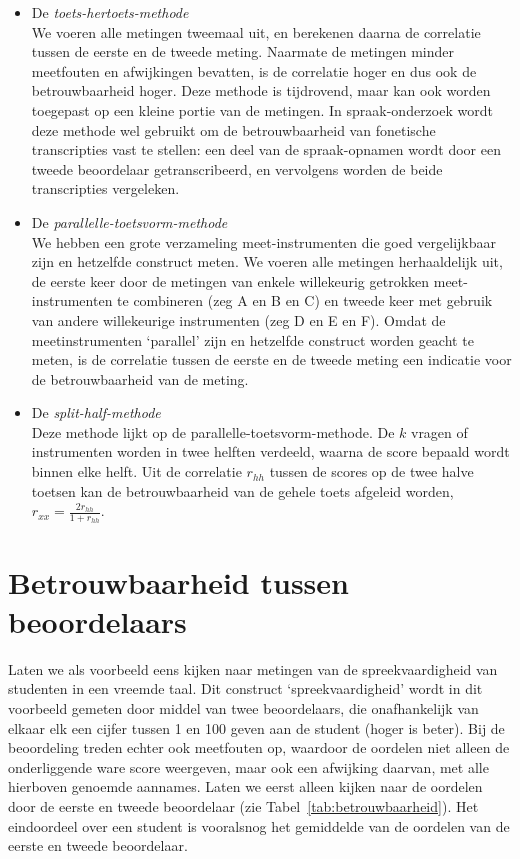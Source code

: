 \documentclass[
]{book}
\begin{document}
\begin{itemize}
\item
  De \emph{toets-hertoets-methode}\\
  We voeren alle metingen tweemaal uit, en berekenen daarna de
  correlatie tussen de eerste en de tweede meting. Naarmate de
  metingen minder meetfouten en afwijkingen bevatten, is de correlatie
  hoger en dus ook de betrouwbaarheid hoger. Deze methode is
  tijdrovend, maar kan ook worden toegepast op een kleine portie van
  de metingen. In spraak-onderzoek wordt deze methode wel gebruikt om
  de betrouwbaarheid van fonetische transcripties vast te stellen: een
  deel van de spraak-opnamen wordt door een tweede beoordelaar
  getranscribeerd, en vervolgens worden de beide transcripties
  vergeleken.
\item
  De \emph{parallelle-toetsvorm-methode}\\
  We hebben een grote verzameling meet-instrumenten die goed
  vergelijkbaar zijn en hetzelfde construct meten. We voeren alle
  metingen herhaaldelijk uit, de eerste keer door de metingen van
  enkele willekeurig getrokken meet-instrumenten te combineren (zeg A
  en B en C) en tweede keer met gebruik van andere willekeurige
  instrumenten (zeg D en E en F). Omdat de meetinstrumenten `parallel'
  zijn en hetzelfde construct worden geacht te meten, is de correlatie
  tussen de eerste en de tweede meting een indicatie voor de
  betrouwbaarheid van de meting.
\item
  De \emph{split-half-methode}\\
  Deze methode lijkt op de parallelle-toetsvorm-methode. De \(k\) vragen
  of instrumenten worden in twee helften verdeeld, waarna de score
  bepaald wordt binnen elke helft. Uit de correlatie \(r_{hh}\) tussen
  de scores op de twee halve toetsen kan de betrouwbaarheid van de
  gehele toets afgeleid worden, \(r_{xx} = \frac{2r_{hh}}{1+r_{hh}}\).
\end{itemize}

\section{Betrouwbaarheid tussen beoordelaars}\label{betrouwbaarheid-tussen-beoordelaars}

Laten we als voorbeeld eens kijken naar metingen van de
spreekvaardigheid van studenten in een vreemde taal. Dit construct
`spreekvaardigheid' wordt in dit voorbeeld gemeten door middel van twee
beoordelaars, die onafhankelijk van elkaar elk een cijfer tussen 1 en
100 geven aan de student (hoger is beter). Bij de beoordeling treden
echter ook meetfouten op, waardoor de oordelen niet alleen de
onderliggende ware score weergeven, maar ook een afwijking daarvan, met
alle hierboven genoemde aannames. Laten we eerst alleen kijken naar de
oordelen door de eerste en tweede beoordelaar (zie
Tabel~\ref{tab:betrouwbaarheid}). Het eindoordeel over een student is
vooralsnog het gemiddelde van de oordelen van de eerste en tweede
beoordelaar.
\end{document}
